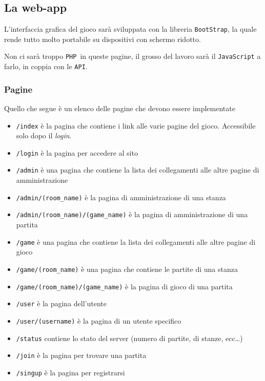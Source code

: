 \documentclass[10pt,a4paper]{article}
\newcommand{\pageurl}[1]{\small\texttt{#1}}
\newcommand{\lang}[1]{\texttt{#1}}
\newcommand{\PHP}{\lang{PHP}}
\newcommand{\API}{\texttt{API}}
\begin{document}
\subsection{La web-app}
L'interfaccia grafica del gioco sarà sviluppata con la libreria \texttt{BootStrap}, la quale rende tutto molto portabile su dispositivi con schermo ridotto. 

Non ci sarà troppo \PHP\ in queste pagine, il grosso del lavoro sarà il \lang{JavaScript} a farlo, in coppia con le \API.

\subsubsection*{Pagine}
Quello che segue è un elenco delle pagine che devono essere implementate
\begin{itemize}
\item \pageurl{/index} è la pagina che contiene i link alle varie pagine del gioco. Accessibile solo dopo il \emph{login}.
\item \pageurl{/login} è la pagina per accedere al sito
\item \pageurl{/admin} è una pagina che contiene la lista dei collegamenti alle altre pagine di amministrazione 
\item \pageurl{/admin/(room\_name)} è la pagina di amministrazione di una stanza
\item \pageurl{/admin/(room\_name)/(game\_name)} è la pagina di amministrazione di una partita
\item \pageurl{/game} è una pagina che contiene la lista dei collegamenti alle altre pagine di gioco
\item \pageurl{/game/(room\_name)} è una pagina che contiene le partite di una stanza
\item \pageurl{/game/(room\_name)/(game\_name)} è la pagina di gioco di una partita
\item \pageurl{/user} è la pagina dell'utente
\item \pageurl{/user/(username)} è la pagina di un utente specifico
\item \pageurl{/status} contiene lo stato del server (numero di partite, di stanze, ecc\dots)
\item \pageurl{/join} è la pagina per trovare una partita
\item \pageurl{/singup} è la pagina per registrarsi
\end{itemize}

\newpage
\end{document}
